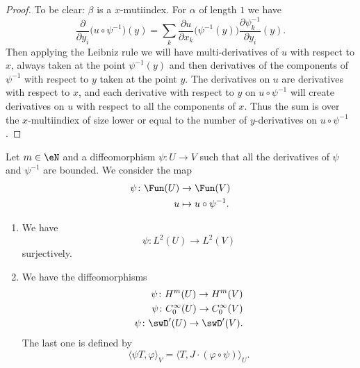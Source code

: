 \begin{proof}
	To be clear: \( \beta\) is a \( x\)-mutiindex. For \( \alpha\) of length \( 1\) we have
	\begin{equation}
		\frac{ \partial  }{ \partial y_i }\big( u\circ\psi^{-1} \big)(y)=\sum_k\frac{ \partial u }{ \partial x_k }\big( \psi^{-1}(y) \big)\frac{ \partial \psi_k^{-1} }{ \partial y_i }(y).
	\end{equation}
	Then applying the Leibniz rule we will have multi-derivatives of \( u\) with respect to \( x\), always taken at the point \( \psi^{-1}(y)\) and then derivatives of the components of \( \psi^{-1}\) with respect to \( y\) taken at the point \( y\). The derivatives on \( u\) are derivatives with respect to \( x\), and each derivative with respect to \( y\) on \( u\circ\psi^{-1}\) will create derivatives on $u$ with respect to all the components of \( x\). Thus the sum is over the \( x\)-multiindiex of size lower or equal to the number of \( y\)-derivatives on \( u\circ\psi^{-1}\).
\end{proof}

\begin{proposition}
	Let \( m\in \eN\) and a diffeomorphism \( \psi\colon U\to V\) such that all the derivatives of \( \psi\) and \( \psi^{-1}\) are bounded. We consider the map
	\begin{equation}
		\begin{aligned}
			\psi\colon \Fun(U) & \to \Fun(V)              \\
			u                  & \mapsto u\circ\psi^{-1}.
		\end{aligned}
	\end{equation}
	\begin{enumerate}
		\item       \label{ITEMooNJZOooOrzQIT}
		      We have
		      \begin{equation}
			      \psi\colon L^2(U)\to L^2(V)
		      \end{equation}
		      surjectively.
		\item
		      We have the diffeomorphisms
		      \begin{subequations}
			      \begin{align}
				      \psi\colon H^m(U)\to H^m(V)                     \\
				      \psi\colon  C^{\infty}_0(U)\to  C^{\infty}_0(V) \\
				      \psi\colon \swD'(U)\to \swD'(V).
			      \end{align}
		      \end{subequations}
		      The last one is defined by
		      \begin{equation}
			      \langle \psi T, \varphi\rangle_V=\langle T, J\cdot(\varphi\circ\psi)\rangle_U.
		      \end{equation}
	\end{enumerate}
\end{proposition}

